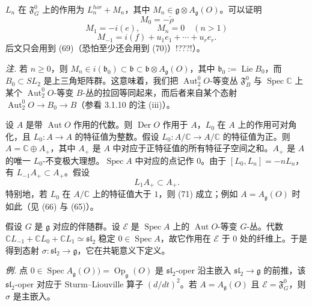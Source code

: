 $L_{n}$ 在 $\mathfrak{F}^{0}_{G}$ 上的作用为 $L_{n}^{hor}+M_{n}$，其中 $M_{n}\in\mathfrak{g}\otimes A_{\mathfrak{g}}(O)$。可以证明
\begin{equation}\tag{69}
M_{0}=-\check\rho
\end{equation}
\begin{equation}\tag{70}
M_{1}=-i(e),\qquad M_{n}=0\quad(n>1)
\end{equation}
\[
M_{-1}=i(f)+u_{1}e_{1}+\cdots+u_{r}e_{r}.
\]
后文只会用到 (69)（恐怕至少还会用到 (70)）!???!）。

\emph{注.} 若 $n\ge0$，则 $M_{n}\in i(\mathfrak{b}_{0})\subset\mathfrak{b}\subset\mathfrak{b}\otimes A_{\mathfrak{g}}(O)$，其中 $\mathfrak{b}_{0}:=\operatorname{Lie}B_{0}$，而 $B_{0}\subset SL_{2}$ 是上三角矩阵群。这意味着，我们把 $\operatorname{Aut}_{2}^{0}O$-等变丛 $\mathfrak{F}^{0}_{B}$ 与 $\operatorname{Spec}\mathbb{C}$ 上某个 $\operatorname{Aut}_{2}^{0}O$-等变 $B$-丛的拉回等同起来，而后者来自某个态射 $\operatorname{Aut}_{2}^{0}O\to B_{0}\to B$（参看 3.1.10 的注 (iii)）。

 设 $A$ 是带 $\operatorname{Aut}O$ 作用的代数。则 $\operatorname{Der}O$ 作用于 $A$，$L_{0}$ 在 $A$ 上的作用可对角化，且 $L_{0}:A\to A$ 的特征值为整数。假设 $L_{0}:A/\mathbb{C}\to A/\mathbb{C}$ 的特征值为正。则 $A=\mathbb{C}\oplus A_{+}$，其中 $A_{+}$ 是 $A$ 中对应于正特征值的所有特征子空间之和。$A_{+}$ 是 $A$ 的唯一 $L_{0}$-不变极大理想。$\operatorname{Spec}A$ 中对应的点记作 $0$。由于 $[L_{0},L_{n}]=-nL_{n}$，有 $L_{-1}A_{+}\subset A_{+}$。假设
\begin{equation}\tag{71}
L_{1}A_{+}\subset A_{+}.
\end{equation}
特别地，若 $L_{0}$ 在 $A/\mathbb{C}$ 上的特征值大于 $1$，则 (71) 成立；例如 $A=A_{\mathfrak{g}}(O)$ 时如此（见 (66) 与 (65)）。

假设 $G$ 是 $\mathfrak{g}$ 对应的伴随群。设 $\mathcal{E}$ 是 $\operatorname{Spec}A$ 上的 $\operatorname{Aut}O$-等变 $G$-丛。代数 $\mathbb{C}L_{-1}+\mathbb{C}L_{0}+\mathbb{C}L_{1}\simeq\mathfrak{sl}_{2}$ 稳定 $0\in\operatorname{Spec}A$，故它作用在 $\mathcal{E}$ 于 $0$ 处的纤维上。于是得到态射 $\sigma:\mathfrak{sl}_{2}\to\mathfrak{g}$，它在共轭意义下定义。

\emph{例.} 点 $0\in\operatorname{Spec}A_{\mathfrak{g}}(O))=\operatorname{Op}_{\mathfrak{g}}(O)$ 是 $\mathfrak{sl}_{2}$-oper 沿主嵌入 $\mathfrak{sl}_{2}\to\mathfrak{g}$ 的前推，该 $\mathfrak{sl}_{2}$-oper 对应于 Sturm--Liouville 算子 $(d/dt)^{2}$。若 $A=A_{\mathfrak{g}}(O)$ 且 $\mathcal{E}=\mathfrak{F}^{0}_{G}$，则 $\sigma$ 是主嵌入。


